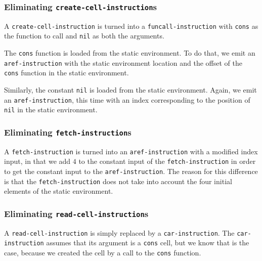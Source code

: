 \subsubsection{Eliminating \texttt{create-cell-instruction}s}

A \texttt{create-cell-instruction} is turned into a
\texttt{funcall-instruction} with \texttt{cons} as the function to
call and \texttt{nil} as both the arguments.

The \texttt{cons} function is loaded from the static environment.  To
do that, we emit an \texttt{aref-instruction} with the static
environment location and the offset of the \texttt{cons} function in
the static environment.

Similarly, the constant \texttt{nil} is loaded from the static
environment.  Again, we emit an \texttt{aref-instruction}, this time with
an index corresponding to the position of \texttt{nil} in the
static environment.%

\subsubsection{Eliminating \texttt{fetch-instruction}s}

A \texttt{fetch-instruction} is turned into an
\texttt{aref-instruction} with a modified index input, in that we add
$4$ to the constant input of the \texttt{fetch-instruction} in order
to get the constant input to the \texttt{aref-instruction}.  The
reason for this difference is that the \texttt{fetch-instruction} does
not take into account the four initial elements of the static
environment.

\subsubsection{Eliminating \texttt{read-cell-instruction}s}

A \texttt{read-cell-instruction} is simply replaced by a
\texttt{car-instruction}.  The \texttt{car-instruction} assumes that
its argument is a \texttt{cons} cell, but we know that is the case,
because we created the cell by a call to the \texttt{cons} function.

